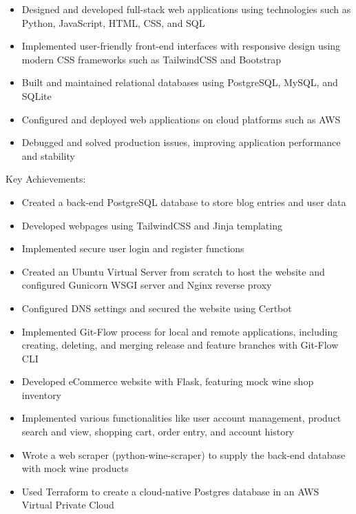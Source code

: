 \documentclass[
    10pt,
    A4,
    english,
    draft = false,
    twoside = false,
]{article}
\begin{document}
    {
    \begin{itemize}
      \item Designed and developed full-stack web applications using technologies such as Python,           JavaScript, HTML, CSS, and SQL
      \item Implemented user-friendly front-end interfaces with responsive design using modern CSS          frameworks such as TailwindCSS and Bootstrap
      \item Built and maintained relational databases using PostgreSQL, MySQL, and SQLite
      \item Configured and deployed web applications on cloud platforms such as AWS
      \item Debugged and solved production issues, improving application performance and stability
    \end{itemize}
    {Key Achievements:}
    \begin{itemize}
      \item Created a back-end PostgreSQL database to store blog entries and user data
      \item Developed webpages using TailwindCSS and Jinja templating
      \item Implemented secure user login and register functions
      \item Created an Ubuntu Virtual Server from scratch to host the website and configured Gunicorn WSGI server and Nginx reverse proxy
      \item Configured DNS settings and secured the website using Certbot
      \item Implemented Git-Flow process for local and remote applications, including creating, deleting, and merging release and feature branches with Git-Flow CLI
  \item Developed eCommerce website with Flask, featuring mock wine shop inventory
   \item Implemented various functionalities like user account management, product search and view, shopping cart, order entry, and account history
   \item  Wrote a web scraper (python-wine-scraper) to supply the back-end database with mock wine products
    \item Used Terraform to create a cloud-native Postgres database in an AWS Virtual Private Cloud
    \end{itemize}
    }
\end{document}
